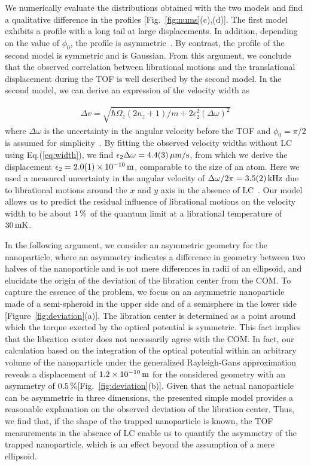 \documentclass[aps, prl, 
amsmath, showpacs, preprintnumbers, twocolumn, amssymb, amsmath, superscriptaddress]{revtex4-1}
\begin{document}
We numerically evaluate the distributions obtained with the two models and find a qualitative difference in the profiles [Fig.~\ref{fig:nums}(c),(d)]. The first model exhibits a profile with a long tail at large displacements. In addition, depending on the value of $\phi_0$, the profile is asymmetric~\cite{fnote7}. By contrast, the profile of the second model is symmetric and is Gaussian. From this argument, we conclude that the observed correlation between librational motions and the translational displacement during the TOF is well described by the second model. In the second model, we can derive an expression of the velocity width as 


\begin{align}
\label{eq:width}
\Delta v = \sqrt{\hbar \Omega_z (2n_z+1)/m+2\epsilon_2^2 (\Delta \omega)^2}
\end{align}
where $\Delta \omega$ is the uncertainty in the angular velocity before the TOF and $\phi_0=\pi/2$ is assumed for simplicity~\cite{fnote7}. By fitting the observed velocity widths without LC using Eq.(\ref{eq:width}), we find $\epsilon_2 \Delta \omega = \unit[4.4(3)]{\mu m/s}$, from which we derive the displacement $\epsilon_2=\unit[2.0(1)\times10^{-10}]{m}$, comparable to the size of an atom. Here we used a measured uncertainty in the angular velocity of $\Delta \omega/2\pi = \unit[3.5(2)]{kHz}$ due to librational motions around the $x$ and $y$ axis in the absence of LC~\cite{fnote7}. Our model allows us to predict the residual influence of librational motions on the velocity width to be about $\unit[1]{\%}$ of the quantum limit at a librational temperature of $\unit[30]{mK}$.



In the following argument, we consider an asymmetric geometry for the nanoparticle, where an asymmetry indicates a difference in geometry between two halves of the nanoparticle and is not mere differences in radii of an ellipsoid, and elucidate the origin of the deviation of the libration center from the COM. To capture the essence of the problem, we focus on an asymmetric nanoparticle made of a semi-spheroid in the upper side and of a semisphere in the lower side [Figure~\ref{fig:deviation}(a)]. The libration center is determined as a point around which the torque exerted by the optical potential is symmetric. This fact implies that the libration center does not necessarily agree with the COM. In fact, our calculation based on the integration of the optical potential within an arbitrary volume of the nanoparticle under the generalized Rayleigh-Gans approximation~\cite{stickler2016rotranslational,seberson2020stability,rudolph2021theory,fnote7} reveals a displacement of $\unit[1.2\times10^{-10}]{m}$ for the considered geometry with an asymmetry of $\unit[0.5]{\%}$[Fig.~\ref{fig:deviation}(b)]. Given that the actual nanoparticle can be asymmetric in three dimensions, the presented simple model provides a reasonable explanation on the observed deviation of the libration center. Thus, we find that, if the shape of the trapped nanoparticle is known, the TOF measurements in the absence of LC enable us to quantify the asymmetry of the trapped nanoparticle, which is an effect beyond the assumption of a mere ellipsoid. 
\end{document}
